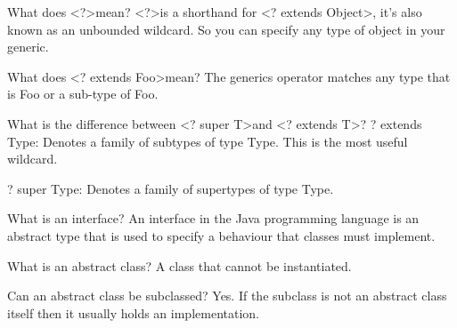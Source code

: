 \documentclass[avery5371,grid]{flashcards}
\begin{document}
\begin{flashcard}[Core]{What does \textless?\textgreater mean?}
\textless?\textgreater is a shorthand for \textless? extends Object\textgreater , it's also known as an unbounded wildcard. So you can specify any type of object in your generic.
\end{flashcard}

\begin{flashcard}[Lang]{What does \textless? extends Foo\textgreater mean?}
The generics operator matches any type that is Foo or a sub-type of Foo.
\end{flashcard}

\begin{flashcard}[Lang]{What is the difference between \textless? super T\textgreater and \textless? extends T\textgreater ?}
? extends Type: Denotes a family of subtypes of type Type. This is the most useful wildcard.

? super Type: Denotes a family of supertypes of type Type.
\end{flashcard}

\begin{flashcard}[Lang]{What is an interface?}
An interface in the Java programming language is an abstract type that is used to specify a behaviour that classes must implement.
\end{flashcard}

\begin{flashcard}[Lang]{What is an abstract class?}
A class that cannot be instantiated.
\end{flashcard}

\begin{flashcard}[Lang]{Can an abstract class be subclassed?}
Yes. If the subclass is not an abstract class itself then it usually holds an implementation.
\end{flashcard}
\end{document}
